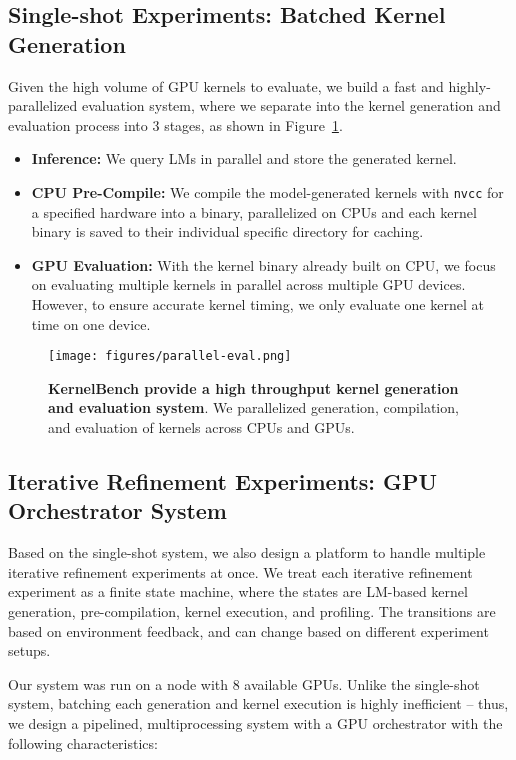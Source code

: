 \subsection{Single-shot Experiments: Batched Kernel Generation}
Given the high volume of GPU kernels to evaluate, we build a fast and highly-parallelized evaluation system, where we separate into the kernel generation and evaluation process into 3 stages, as shown in Figure~\ref{fig:parallel-eval-system}.
\begin{itemize}
    \item \textbf{Inference:} We query LMs in parallel and store the generated kernel.
    \item \textbf{CPU Pre-Compile:} We compile the model-generated kernels with \texttt{nvcc} for a specified hardware into a binary, parallelized on CPUs and each kernel binary is saved to their individual specific directory for caching. 
    \item \textbf{GPU Evaluation:} With the kernel binary already built on CPU, we focus on evaluating multiple kernels in parallel across multiple GPU devices. However, to ensure accurate kernel timing, we only evaluate one kernel at time on one device. 
\end{itemize}

\begin{figure}[h]
    \centering
    \texttt{[image: figures/parallel-eval.png]}
    \caption{\textbf{KernelBench provide a high throughput kernel generation and evaluation system}. We parallelized generation, compilation, and evaluation of kernels across CPUs and GPUs.}
    \label{fig:parallel-eval-system}
\end{figure}

\subsection{Iterative Refinement Experiments: GPU Orchestrator System}

Based on the single-shot system, we also design a platform to handle multiple iterative refinement experiments at once. We treat each iterative refinement experiment as a finite state machine, where the states are LM-based kernel generation, pre-compilation, kernel execution, and profiling. The transitions are based on environment feedback, and can change based on different experiment setups.

Our system was run on a node with $8$ available GPUs. Unlike the single-shot system, batching each generation and kernel execution is highly inefficient -- thus, we design a pipelined, multiprocessing system with a GPU orchestrator with the following characteristics:

